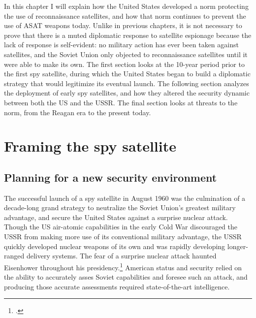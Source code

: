 \documentclass[11pt]{memoir}
\begin{document}
In this chapter I will explain how the United States developed a norm protecting the use of reconnaissance satellites, and how that norm continues to prevent the use of ASAT weapons today. Unlike in previous chapters, it is not necessary to prove that there is a muted diplomatic response to satellite espionage because the lack of response is self-evident: no military action has ever been taken against satellites, and the Soviet Union only objected to reconnaissance satellites until it were able to make its own. The first section looks at the 10-year period prior to the first spy satellite, during which the United States began to build a diplomatic strategy that would legitimize its eventual launch. The following section analyzes the deployment of early spy satellites, and how they altered the security dynamic between both the US and the USSR. The final section looks at threats to the norm, from the Reagan era to the present today.

\section{Framing the spy satellite}
\subsection{Planning for a new security environment}
The successful launch of a spy satellite in August 1960 was the culmination of a decade-long grand strategy to neutralize the Soviet Union's greatest military advantage, and secure the United States against a surprise nuclear attack. Though the US air-atomic capabilities in the early Cold War discouraged the USSR from making more use of its conventional military advantage, the USSR quickly developed nuclear weapons of its own and was rapidly developing longer-ranged delivery systems. The fear of a surprise nuclear attack haunted Eisenhower throughout his presidency.\footcite[p.~68]{killian_sputnik_1977} American status and security relied on the ability to accurately asses Soviet capabilities and foresee such an attack, and producing those accurate assessments required state-of-the-art intelligence.
\end{document}
